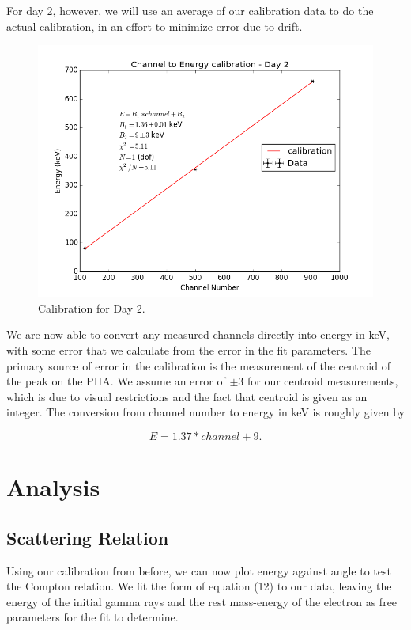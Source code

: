 \documentclass{article}
\begin{document}
For day 2, however, we will use an average of our calibration data to do the actual calibration, in an effort to minimize error due to drift.

\begin{figure}[!htb]
	\centering
	\includegraphics[scale=.75]{plots/cal2.png}
  	\caption{Calibration for Day 2.} 
 	\label{cal2}
\end{figure}

\hspace{.25cm}

We are now able to convert any measured channels directly into energy in keV, with some error that we calculate from the error in the fit parameters. The primary source of error in the calibration is the measurement of the centroid of the peak on the PHA. We assume an error of $\pm 3$ for our centroid measurements, which is due to visual restrictions and the fact that centroid is given as an integer. The conversion from channel number to energy in keV is roughly given by

\begin{equation}
	E = 1.37 * channel + 9 .
\end{equation}


\section{Analysis}
\subsection{Scattering Relation}

Using our calibration from before, we can now plot energy against angle to test the Compton relation. We fit the form of equation (12) to our data, leaving the energy of the initial gamma rays and the rest mass-energy of the electron as free parameters for the fit to determine.
\end{document}
